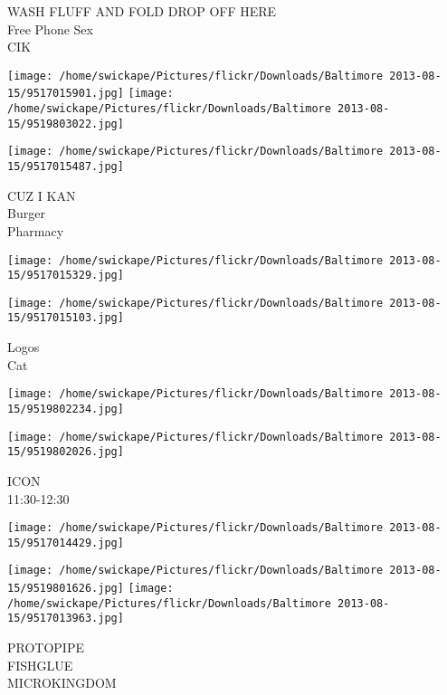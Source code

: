 \documentclass[10pt,letterpaper]{article}
\begin{document}
WASH FLUFF AND FOLD DROP OFF HERE\\
Free Phone Sex\\
CIK\\
\pagebreak

\texttt{[image: /home/swickape/Pictures/flickr/Downloads/Baltimore 2013-08-15/9517015901.jpg]}
\texttt{[image: /home/swickape/Pictures/flickr/Downloads/Baltimore 2013-08-15/9519803022.jpg]}

\vspace{0.25in}
\texttt{[image: /home/swickape/Pictures/flickr/Downloads/Baltimore 2013-08-15/9517015487.jpg]}

CUZ I KAN\\
Burger\\
Pharmacy\\
\pagebreak

\texttt{[image: /home/swickape/Pictures/flickr/Downloads/Baltimore 2013-08-15/9517015329.jpg]}

\vspace{0.25in}
\texttt{[image: /home/swickape/Pictures/flickr/Downloads/Baltimore 2013-08-15/9517015103.jpg]}

Logos\\
Cat\\
\pagebreak

\texttt{[image: /home/swickape/Pictures/flickr/Downloads/Baltimore 2013-08-15/9519802234.jpg]}

\vspace{0.25in}
\texttt{[image: /home/swickape/Pictures/flickr/Downloads/Baltimore 2013-08-15/9519802026.jpg]}

ICON\\
11:30{-}12:30\\
\pagebreak

\texttt{[image: /home/swickape/Pictures/flickr/Downloads/Baltimore 2013-08-15/9517014429.jpg]}

\vspace{0.25in}
\texttt{[image: /home/swickape/Pictures/flickr/Downloads/Baltimore 2013-08-15/9519801626.jpg]}
\texttt{[image: /home/swickape/Pictures/flickr/Downloads/Baltimore 2013-08-15/9517013963.jpg]}

PROTOPIPE\\
FISHGLUE\\
MICROKINGDOM\\
\pagebreak
\end{document}
